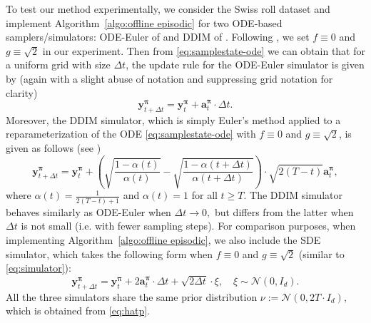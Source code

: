 \documentclass[11pt]{article}
\newcommand{\bpi}{\boldsymbol{\pi}}
\begin{document}
To test our method experimentally, we consider the Swiss roll dataset and implement Algorithm~\ref{algo:offline episodic} for two ODE-based samplers/simulators: ODE-Euler of \cite{SongICLR2021}  and DDIM of \cite{song2020denoising}. %
Following \cite{song2020denoising}, we set $f\equiv 0$ and $g\equiv \sqrt{2}$ in our experiment. Then from \eqref{eq:samplestate-ode} we can obtain that for a uniform grid with size $\Delta t$, the update rule for the ODE-Euler simulator is given by (again with a slight abuse of notation and suppressing grid notation for clarity)
\begin{equation*}
		\mathbf{y}^{\bpi}_{t + \Delta t} = \mathbf{y}^{\bpi}_t + \mathbf{a}^{\bpi}_t \cdot \Delta t.
\end{equation*}
Moreover, the DDIM simulator, which is simply Euler's method applied to a reparameterization of the ODE \eqref{eq:samplestate-ode} with $f\equiv 0$ and $g\equiv \sqrt{2}$, is given as follows (see \citealp{song2020denoising})
\begin{equation*}
	\mathbf{y}^{\mathbf{\pi}}_{t + \Delta t} = \mathbf{y}^{\mathbf{\pi}}_t +\left( \sqrt{\frac{1 - \alpha(t)}{\alpha(t)}}- \sqrt{\frac{1 - \alpha(t + \Delta t)}{\alpha(t + \Delta t)}}\right)\cdot \sqrt{2(T - t)}\mathbf{a}^{\bpi}_t,
\end{equation*}
where $\alpha(t) = \frac{1}{2(T - t) +1}$ and $\alpha(t) = 1$ for all $t\ge T$. The DDIM simulator behaves similarly as ODE-Euler when $\Delta t \rightarrow 0,$ but differs from the latter when $\Delta t$ is not small (i.e. with fewer sampling steps).
For comparison purposes, when implementing Algorithm~\ref{algo:offline episodic}, we also include the SDE simulator, which takes the following form when $f\equiv0$ and $g \equiv \sqrt{2}$ (similar to \eqref{eq:simulator}):
\begin{equation*}
	\mathbf{y}^{\mathbf{\pi}}_{t + \Delta t} = \mathbf{y}^{\mathbf{\pi}}_t + 2\mathbf{a}^{\bpi}_t \cdot \Delta t + \sqrt{2\Delta t}\cdot \xi,\quad  \xi \sim\mathcal{N}(0, I_d).
\end{equation*}
All the three simulators share the same prior distribution $\nu := \mathcal{N}(0, 2T\cdot I_d),$ which is obtained from \eqref{eq:hatp}.
\end{document}
